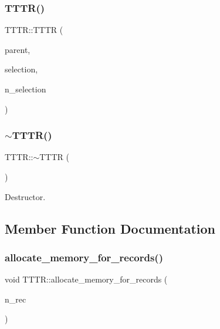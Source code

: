 \mbox{\label{class_t_t_t_r_a0d329594e9c75d7c5091fa22e41f9cff}} 
\subsubsection{\texorpdfstring{T\+T\+T\+R()}{TTTR()}\hspace{0.1cm}{\footnotesize\ttfamily [6/6]}}
{\footnotesize\ttfamily T\+T\+T\+R\+::\+T\+T\+TR (\begin{DoxyParamCaption}\item[{\hyperlink{class_t_t_t_r}{T\+T\+TR} $\ast$}]{parent,  }\item[{unsigned long long $\ast$}]{selection,  }\item[{int}]{n\+\_\+selection }\end{DoxyParamCaption})}

\mbox{\label{class_t_t_t_r_ab5fdf04da2517b2cfbfcb279f9e9aee0}} 
\subsubsection{\texorpdfstring{$\sim$\+T\+T\+T\+R()}{~TTTR()}}
{\footnotesize\ttfamily T\+T\+T\+R\+::$\sim$\+T\+T\+TR (\begin{DoxyParamCaption}{ }\end{DoxyParamCaption})}



Destructor. 



\subsection{Member Function Documentation}
\mbox{\label{class_t_t_t_r_aca21b423928f92dce134c2b98057cc0a}} 
\subsubsection{\texorpdfstring{allocate\+\_\+memory\+\_\+for\+\_\+records()}{allocate\_memory\_for\_records()}}
{\footnotesize\ttfamily void T\+T\+T\+R\+::allocate\+\_\+memory\+\_\+for\+\_\+records (\begin{DoxyParamCaption}\item[{size\+\_\+t}]{n\+\_\+rec }\end{DoxyParamCaption})\hspace{0.3cm}{\ttfamily [protected]}}



